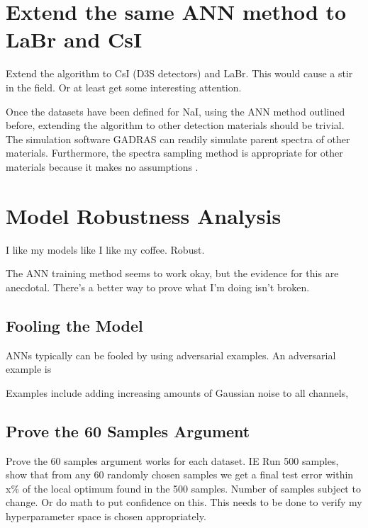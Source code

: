 \documentclass[thesis,tocnosub,noragright,centerchapter,12pt,fullpage]{uiucecethesis09}
\begin{document}


\section{Extend the same ANN method to LaBr and CsI}
   
Extend the algorithm to CsI (D3S detectors) and LaBr. This would cause a stir in the field. Or at least get some interesting attention. 

Once the datasets have been defined for NaI, using the ANN method outlined before, extending the algorithm to other detection materials should be trivial. The simulation software GADRAS can readily simulate parent spectra of other materials. Furthermore, the spectra sampling method is appropriate for other materials because it makes no assumptions .  

\section{Model Robustness Analysis}

I like my models like I like my coffee. Robust.

The ANN training method seems to work okay, but the evidence for this are anecdotal. There's a better way to prove what I'm doing isn't broken.

\subsection{Fooling the Model}

    ANNs typically can be fooled by using adversarial examples. An adversarial example is  
    
    Examples include adding increasing amounts of Gaussian noise to all channels, 



\subsection{Prove the 60 Samples Argument}

    

    Prove the 60 samples argument works for each dataset. IE Run 500 samples, show that from any 60 randomly chosen samples we get a final test error within x\% of the local optimum found in the 500 samples. Number of samples subject to change. Or do math to put confidence on this. This needs to be done to verify my hyperparameter space is chosen appropriately.    
\end{document}

